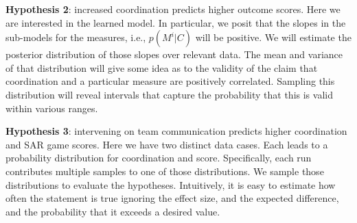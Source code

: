\textbf{Hypothesis 2}: increased coordination predicts higher outcome scores.
Here we are interested in the learned model. In particular, we posit that the
slopes in the sub-models for the measures, i.e., $p(M^i|C)$ will be positive. We
will estimate the posterior distribution of those slopes over relevant data. The
mean and variance of that distribution will give some idea as to the validity of
the claim that coordination and a particular measure are positively correlated.
Sampling this distribution will reveal intervals that capture the probability
that this is valid within various ranges. 

\textbf{Hypothesis 3}: intervening on team communication predicts higher
coordination and SAR game scores. Here we have two distinct data cases. Each leads to
a probability distribution for coordination and score. Specifically, each run
contributes multiple samples to one of those distributions. We sample those
distributions to evaluate the hypotheses. Intuitively, it is easy to estimate
how often the statement is true ignoring the effect size, and the expected
difference, and the probability that it exceeds a desired value.  




